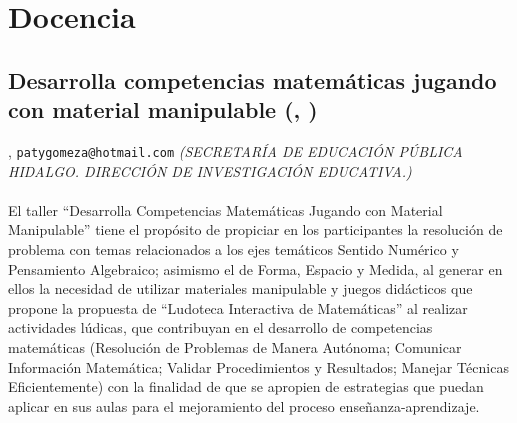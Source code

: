 \section{Docencia}

\subsection{\sffamily Desarrolla competencias matemáticas jugando con material manipulable {\footnotesize (, )}} \label{reg-1753} 
, {\tt patygomeza@hotmail.com}  {\slshape (SECRETARÍA DE EDUCACIÓN PÚBLICA HIDALGO. DIRECCIÓN DE INVESTIGACIÓN EDUCATIVA.)}\\
\\
\noindent El taller “Desarrolla Competencias Matemáticas Jugando con Material Manipulable” tiene el propósito de propiciar en los participantes la resolución de problema con temas relacionados a los ejes temáticos Sentido Numérico y Pensamiento Algebraico; asimismo el de Forma, Espacio y Medida, al generar en ellos la necesidad de utilizar materiales manipulable y juegos didácticos que propone la propuesta de “Ludoteca Interactiva de Matemáticas” al realizar actividades lúdicas, que contribuyan en el desarrollo de competencias matemáticas (Resolución de Problemas de Manera Autónoma; Comunicar Información Matemática; Validar Procedimientos y Resultados; Manejar Técnicas Eficientemente) con la finalidad de que se apropien de estrategias que puedan aplicar en sus aulas para el mejoramiento del proceso enseñanza-aprendizaje.
